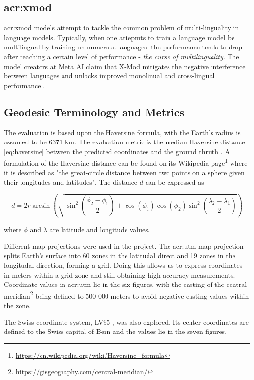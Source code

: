 \subsection[X-Mod]{\acrshort{acr:xmod}}

\gls{acr:xmod} models \citep{pfeifferLiftingCurseMultilinguality2022} attempt to tackle the common problem of multi-linguality in language models. Typically, when one attepmts to train a  language model be multilingual by training on numerous languages, the performance tends to drop after reaching a certain level of performance - \textit{the curse of multilinguality}. The model creators at Meta AI claim that X-Mod mitigates the negative interference between languages and unlocks improved monolinual and cross-lingual performance \citep[1]{pfeifferLiftingCurseMultilinguality2022}.

\subsection{Geodesic Terminology and Metrics}

The evaluation is based upon the Haversine formula, with the Earth's radius is assumed to be 6371 km. The evaluation metric is the median Haversine distance \eqref{eq:haversine} between the predicted coordinates and the ground thruth \citep[4]{scherrerHeLjuVarDial20202020}. A formulation of the Haversine distance can be found on its Wikipedia page\footnote{\url{https://en.wikipedia.org/wiki/Haversine_formula}} where it is described as "the great-circle distance between two points on a sphere given their longitudes and latitudes". The distance $d$ can be expressed as

\begin{equation}
    d = 2r \arcsin\left(\sqrt{\sin^2\left(\frac{\phi_2 - \phi_1}{2}\right) + \cos(\phi_1)\cos(\phi_2)\sin^2\left(\frac{\lambda_2 - \lambda_1}{2}\right)}\right)
    \label{eq:haversine}
\end{equation}

\noindent where $\phi$ and $\lambda$ are latitude and longitude values.

Different map projections were used in the project. The \gls{acr:utm} map projection splits Earth's surface into 60 zones in the latitudal direct and 19 zones in the longitudal direction, forming a grid. Doing this allows us to express coordinates in meters within a grid zone and still obtaining high accuracy measurements. Coordinate values in \acrshort{acr:utm} lie in the six figures, with the easting of the central meridian\footnote{\url{https://gisgeography.com/central-meridian/}} being defined to 500 000 meters to avoid negative easting values within the zone.

The Swiss coordinate system, LV95 \citep{federalofficeoftopographyswisstopoSwissCoordinatesSystem}, was also explored. Its center coordinates are defined to the Swiss capital of Bern and the values lie in the seven figures.
